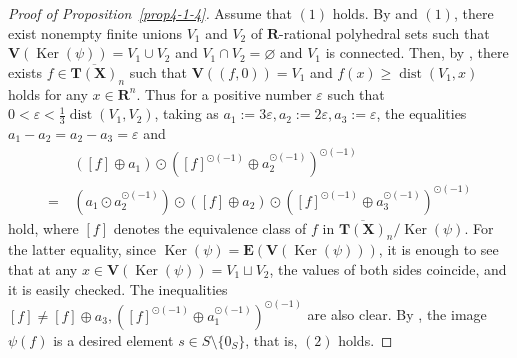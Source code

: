 \documentclass[a4paper,12pt]{amsart}
\begin{document}
\begin{proof}[Proof of Proposition~\ref{prop4-1-4}]
Assume that $(1)$ holds.
By \cite[Corollary~3.5]{JuAe5} and $(1)$, there exist nonempty finite unions $V_1$ and $V_2$ of $\boldsymbol{R}$-rational polyhedral sets such that $\boldsymbol{V}(\operatorname{Ker}(\psi)) = V_1 \cup V_2$ and $V_1 \cap V_2 = \varnothing$ and $V_1$ is connected.
Then, by \cite[Lemmas~3.9 and 3.10]{JuAe5}, there exists $f \in \overline{\boldsymbol{T}(\boldsymbol{X})}_n$ such that $\boldsymbol{V}((f,0)) = V_1$ and $f(x) \ge \operatorname{dist}(V_1, x)$ holds for any $x \in \boldsymbol{R}^n$.
Thus for a positive number $\varepsilon$ such that $0 < \varepsilon < \frac{1}{3} \operatorname{dist}(V_1, V_2)$, taking as $a_1 := 3\varepsilon, a_2 := 2\varepsilon, a_3 := \varepsilon$, the equalities $a_1 - a_2 = a_2 - a_3 = \varepsilon$ and
\begin{align*}
&~([f] \oplus a_1) \odot \left([f]^{\odot (-1)} \oplus a_2^{\odot (-1)} \right)^{\odot (-1)}\\
=&~ \left( a_1 \odot a_2^{\odot (-1)} \right) \odot ([f] \oplus a_2) \odot \left( [f]^{\odot (-1)} \oplus a_3^{\odot (-1)} \right)^{\odot (-1)}
\end{align*}
hold, where $[f]$ denotes the equivalence class of $f$ in $\overline{\boldsymbol{T}(\boldsymbol{X})}_n / \operatorname{Ker}(\psi)$.
For the latter equality, since $\operatorname{Ker}(\psi) = \boldsymbol{E}(\boldsymbol{V}(\operatorname{Ker}(\psi)))$, it is enough to see that at any $x \in \boldsymbol{V}(\operatorname{Ker}(\psi)) = V_1 \sqcup V_2$, the values of both sides coincide, and it is easily checked.
The inequalities $[f] \not= [f] \oplus a_3, \left( [f]^{\odot (-1)} \oplus a_1^{\odot (-1)} \right)^{\odot (-1)}$ are also clear.
By \cite[Proposition~2.4.4]{Giansiracusa=Giansiracusa}, the image $\psi(f)$ is a desired element $s \in S \setminus \{ 0_S \}$, that is, $(2)$ holds.


\end{proof}
\end{document}
